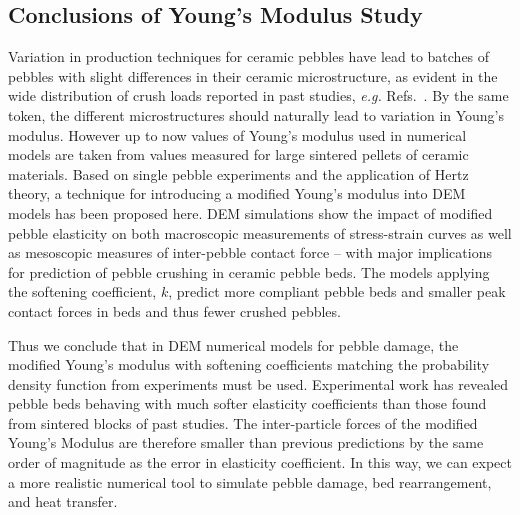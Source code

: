 \subsection{Conclusions of Young's Modulus Study}
Variation in production techniques for ceramic pebbles have lead to batches of pebbles with slight differences in their ceramic microstructure, as evident in the wide distribution of crush loads reported in past studies, \textit{e.g.} Refs.~\cite{Zhao2012,Mandal2012a}. By the same token, the different microstructures should naturally lead to variation in Young’s modulus. However up to now values of Young’s modulus used in numerical models are taken from values measured for large sintered pellets of ceramic materials. Based on single pebble experiments and the application of Hertz theory, a technique for introducing a modified Young’s modulus into DEM models has been proposed here. DEM simulations show the impact of modified pebble elasticity on both macroscopic measurements of stress-strain curves as well as mesoscopic measures of inter-pebble contact force -- with major implications for prediction of pebble crushing in ceramic pebble beds. The models applying the softening coefficient, $k$, predict more compliant pebble beds and smaller peak contact forces in beds and thus fewer crushed pebbles.

Thus we conclude that in DEM numerical models for pebble damage, the modified Young's modulus with softening coefficients matching the probability density function from experiments must be used. Experimental work has revealed pebble beds behaving with much softer elasticity coefficients than those found from sintered blocks of past studies. The inter-particle forces of the modified Young's Modulus are therefore smaller than previous predictions by the same order of magnitude as the error in elasticity coefficient. In this way, we can expect a more realistic numerical tool to simulate pebble damage, bed rearrangement, and heat transfer.